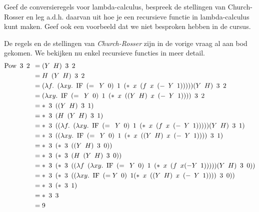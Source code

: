\begin{quest}[Recursie]
	Geef de conversieregels voor lambda-calculus, bespreek de stellingen van Church-Rosser en leg a.d.h. daarvan uit hoe je een recursieve functie in lambda-calculus kunt maken. Geef ook een voorbeeld dat we niet besproken hebben in de cursus.
\end{quest}

De regels en de stellingen van \emph{Church-Rosser} zijn in de vorige vraag al aan bod gekomen. We bekijken nu enkel recursieve functies in meer detail.\\

\begin{align*}
	\text{Pow} \enskip  3 \enskip 2 \enskip &= (Y\enskip H) \enskip 3 \enskip 2
	\\&= H \enskip (Y\enskip H) \enskip 3 \enskip 2
	\\&= (\lambda f. \enskip (\lambda xy. \enskip \text{IF} \enskip (= \enskip Y \enskip 0) \enskip 1 \enskip (* \enskip x \enskip (f \enskip x \enskip (- \enskip Y \enskip 1)))))(Y\enskip H) \enskip 3 \enskip 2
	\\&= (\lambda xy. \enskip \text{IF} \enskip (= \enskip Y \enskip 0) \enskip 1 \enskip (* \enskip x \enskip ((Y \enskip H) \enskip x \enskip (- \enskip Y \enskip 1)))) \enskip 3 \enskip 2
	\\&= * \enskip 3 \enskip ((Y \enskip H) \enskip 3 \enskip 1)
	\\&= * \enskip 3 \enskip (H \enskip (Y \enskip H) \enskip 3 \enskip 1)
	\\&= * \enskip 3 \enskip ((\lambda f. \enskip (\lambda xy. \enskip \text{IF} \enskip (= \enskip Y \enskip 0) \enskip 1 \enskip (* \enskip x \enskip (f \enskip x \enskip (- \enskip Y \enskip 1)))))(Y \enskip H) \enskip 3 \enskip 1)
	\\&= * \enskip 3 \enskip ((\lambda xy. \enskip \text{IF} \enskip (= \enskip Y \enskip 0) \enskip 1 \enskip (* \enskip x \enskip ((Y\enskip H)\enskip x\enskip (- \enskip Y \enskip 1)))) \enskip 3 \enskip 1)
	\\&= * \enskip 3 \enskip (* \enskip 3 \enskip ((Y \enskip H)\enskip 3 \enskip 0))
	\\&= * \enskip 3 \enskip (* \enskip 3 \enskip (H\enskip (Y \enskip H) \enskip 3 \enskip 0))
	\\&= * \enskip 3 \enskip (* \enskip 3 \enskip ((\lambda f \enskip (\lambda xy. \enskip \text{IF} \enskip (= \enskip Y \enskip 0)\enskip 1\enskip (* \enskip x\enskip (f \enskip x(-Y \enskip 1)))))(Y \enskip H)\enskip 3 \enskip 0))
	\\&= * \enskip 3 \enskip (* \enskip 3 \enskip ((\lambda xy. \enskip \text{IF} \enskip (=Y \enskip 0) \enskip 1(* \enskip x \enskip ((Y \enskip H)\enskip x\enskip (- \enskip Y \enskip 1))))\enskip 3 \enskip 0))
	\\&= * \enskip 3 \enskip (* \enskip 3 \enskip 1)
	\\&= * \enskip 3 \enskip 3
	\\&= 9
\end{align*}
